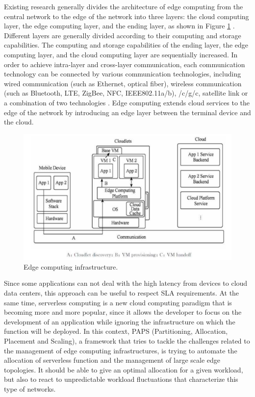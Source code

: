 Existing research generally divides the architecture of edge computing from the central network to the 
edge of the network into three layers: the cloud computing layer, the edge computing layer, and the ending
layer, as shown in Figure \ref{fig:edge_infr} \cite{IoT,Edge4,Edge5}. Different layers are generally divided according to their computing 
and storage capabilities. The computing and storage capabilities of the ending layer, the edge computing
layer, and the cloud computing layer are sequentially increased. In order to achieve intra-layer and
cross-layer communication, each communication technology can be connected by various communication 
technologies, including wired communication (such as Ethernet, optical fiber), wireless communication 
(such as Bluetooth, LTE, ZigBee, NFC, IEEE802.11a/b), /c/g/c, satellite link or a combination of two 
technologies \cite{Communication}. Edge computing extends cloud services to the edge of the network by introducing an edge 
layer between the terminal device and the cloud.

\begin{figure}
    \includegraphics[width=\textwidth]{Images/Edge_infrastructure.png}
    \caption{Edge computing infrastructure.}
    \label{fig:edge_infr}
\end{figure}

Since some applications can not deal with the high latency from devices to cloud data centers, this approach 
can be useful to respect SLA requirements. 
At the same time, serverless computing is a new cloud computing paradigm that is becoming more
and more popular, since it allows the developer to focus on the development of an application
while ignoring the infrastructure on which the function will be deployed. In this context, 
PAPS (Partitioning, Allocation, Placement and Scaling), a framework that tries to tackle the challenges related to the management of edge computing infrastructures, 
is trying to automate the allocation of serverless function and the management of large scale edge topologies.
It should be able to give an optimal allocation for a given workload, but also
to react to unpredictable workload fluctuations that characterize this type of networks.

